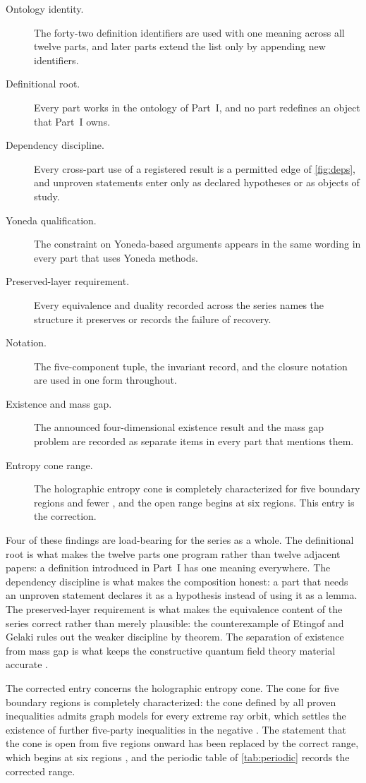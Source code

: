 \documentclass[11pt,letterpaper]{article}
\theoremstyle{definition}
\theoremstyle{remark}
\begin{document}
\begin{description}
\item[Ontology identity.] The forty-two definition identifiers are used with one meaning across all twelve parts, and later parts extend the list only by appending new identifiers.
\item[Definitional root.] Every part works in the ontology of Part~I, and no part redefines an object that Part~I owns.
\item[Dependency discipline.] Every cross-part use of a registered result is a permitted edge of \cref{fig:deps}, and unproven statements enter only as declared hypotheses or as objects of study.
\item[Yoneda qualification.] The constraint on Yoneda-based arguments appears in the same wording in every part that uses Yoneda methods.
\item[Preserved-layer requirement.] Every equivalence and duality recorded across the series names the structure it preserves or records the failure of recovery.
\item[Notation.] The five-component tuple, the invariant record, and the closure notation are used in one form throughout.
\item[Existence and mass gap.] The announced four-dimensional existence result and the mass gap problem are recorded as separate items in every part that mentions them.
\item[Entropy cone range.] The holographic entropy cone is completely characterized for five boundary regions and fewer \cite{corpus-47,corpus-73}, and the open range begins at six regions. This entry is the correction.
\end{description}

Four of these findings are load-bearing for the series as a whole. The definitional root is what makes the twelve parts one program rather than twelve adjacent papers: a definition introduced in Part~I has one meaning everywhere. The dependency discipline is what makes the composition honest: a part that needs an unproven statement declares it as a hypothesis instead of using it as a lemma. The preserved-layer requirement is what makes the equivalence content of the series correct rather than merely plausible: the counterexample of Etingof and Gelaki \cite{corpus-74} rules out the weaker discipline by theorem. The separation of existence from mass gap is what keeps the constructive quantum field theory material accurate \cite{corpus-23,corpus-24,corpus-25}.

The corrected entry concerns the holographic entropy cone. The cone for five boundary regions is completely characterized: the cone defined by all proven inequalities admits graph models for every extreme ray orbit, which settles the existence of further five-party inequalities in the negative \cite{corpus-73}. The statement that the cone is open from five regions onward has been replaced by the correct range, which begins at six regions \cite{corpus-47}, and the periodic table of \cref{tab:periodic} records the corrected range.
\end{document}
